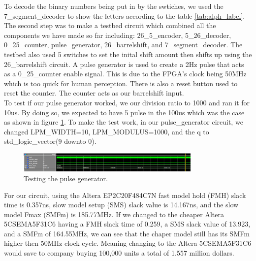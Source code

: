 \documentclass[10pt]{article}
\begin{document}
To decode the binary numbers being put in by the swtiches, we used the 7\_segment\_decoder to show the letters according to the table \ref{tab:alph_label}.
The second step was to make a testbed circuit which combined all the components we have made so far including: 26\_5\_encoder, 5\_26\_decoder, 0\_25\_counter, pulse\_generator, 26\_barrelshift, and 7\_segment\_decoder. The testbed also used 5 switches to set the inital shift amount then shifts up using the 26\_barrelshift circuit. A pulse generator is used to create a 2Hz pulse that acts as a 0\_25\_counter enable signal. This is due to the FPGA's clock being 50MHz which is too quick for human perception. There is also a reset button used to reset the counter. The counter acts as our barrelshift input.\\
To test if our pulse generator worked, we our division ratio to 1000 and ran it for 10us. By doing so, we expected to have 5 pulse in the 100us which was the case as shown in figure \ref{fig:test_bed}. To make the test work, in our pulse\_generator circuit, we changed LPM\_WIDTH=10, LPM\_MODULUS=1000, and the q to std\_logic\_vector(9 downto 0).
\begin{figure}[!htb]
    \centering
    \includegraphics[width=0.8\textwidth]{./test_bed.png}
    \caption{Testing the pulse generator.}
    \label{fig:test_bed}
\end{figure}

For our circuit, using the Altera EP2C20F484C7N fast model hold (FMH) slack time is 0.357ns, slow model setup (SMS) slack value is 14.167ns, and the slow model Fmax (SMFm) is 185.77MHz. If we changed to the cheaper Altera 5CSEMA5F31C6 having a FMH slack time of 0.259, a SMS slack value of 13.923, and a SMFm of 164.55MHz, we can see that the chaper model still has its SMFm higher then 50MHz clock cycle. Meaning changing to the Altera 5CSEMA5F31C6 would save to company buying 100,000 units a total of 1.557 million dollars.
\end{document}
